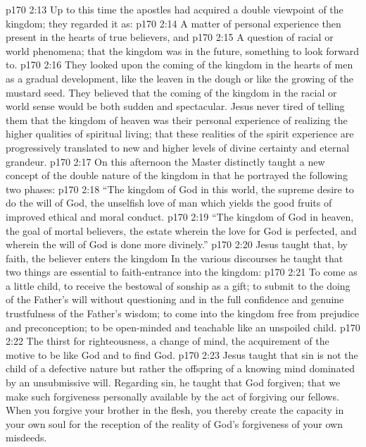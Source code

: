\vs p170 2:13 Up to this time the apostles had acquired a double viewpoint of the kingdom; they regarded it as:
\vs p170 2:14 \bibnobreakspace A matter of personal experience then present in the hearts of true believers, and
\vs p170 2:15 \bibnobreakspace A question of racial or world phenomena; that the kingdom was in the future, something to look forward to.
\vs p170 2:16 \pc They looked upon the coming of the kingdom in the hearts of men as a gradual development, like the leaven in the dough or like the growing of the mustard seed. They believed that the coming of the kingdom in the racial or world sense would be both sudden and spectacular. Jesus never tired of telling them that the kingdom of heaven was their personal experience of realizing the higher qualities of spiritual living; that these realities of the spirit experience are progressively translated to new and higher levels of divine certainty and eternal grandeur.
\vs p170 2:17 On this afternoon the Master distinctly taught a new concept of the double nature of the kingdom in that he portrayed the following two phases:
\vs p170 2:18 \textcolor{ubdarkred}{“\bibnobreakspace The kingdom of God in this world, the supreme desire to do the will of God, the unselfish love of man which yields the good fruits of improved ethical and moral conduct.}
\vs p170 2:19 \textcolor{ubdarkred}{“\bibnobreakspace The kingdom of God in heaven, the goal of mortal believers, the estate wherein the love for God is perfected, and wherein the will of God is done more divinely.”}
\vs p170 2:20 Jesus taught that, by faith, the believer enters the kingdom  In the various discourses he taught that two things are essential to faith\hyp{}entrance into the kingdom:
\vs p170 2:21 \pc {}\bibnobreakspace {} To come as a little child, to receive the bestowal of sonship as a gift; to submit to the doing of the Father’s will without questioning and in the full confidence and genuine trustfulness of the Father’s wisdom; to come into the kingdom free from prejudice and preconception; to be open\hyp{}minded and teachable like an unspoiled child.
\vs p170 2:22 \pc {}\bibnobreakspace {} The thirst for righteousness, a change of mind, the acquirement of the motive to be like God and to find God.
\vs p170 2:23 Jesus taught that sin is not the child of a defective nature but rather the offspring of a knowing mind dominated by an unsubmissive will. Regarding sin, he taught that God  forgiven; that we make such forgiveness personally available by the act of forgiving our fellows. When you forgive your brother in the flesh, you thereby create the capacity in your own soul for the reception of the reality of God’s forgiveness of your own misdeeds.
